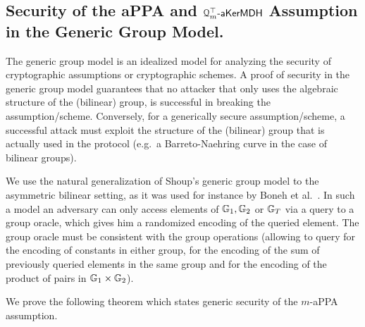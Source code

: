 \subsection{Security of the aPPA and $\mathcal{Q}_m^\top\mbox{-}\mathsf{aKerMDH}$ Assumption in the Generic Group Model.}
The generic group model is an idealized model for analyzing the security of cryptographic assumptions or cryptographic schemes. A proof of security in the generic group model guarantees that no attacker that only uses the algebraic structure of the (bilinear) group, is successful in breaking the assumption/scheme. Conversely, for a generically secure assumption/scheme, a successful attack must exploit the structure of the (bilinear) group that is actually used in the protocol (e.g.~a Barreto-Naehring curve in the case of bilinear groups).  

We use the natural generalization of Shoup's generic group model \cite{EC:Shoup97} to the asymmetric bilinear setting, as it was used for instance by Boneh et al.~\cite{EC:BonBoyGoh05}. In such a model an adversary can only access elements of $\mathbb{G}_1,\mathbb{G}_2$ or $\mathbb{G}_T$ via a query to a group oracle, which gives him a randomized  encoding of the queried element. The group oracle must be consistent with the group operations (allowing to query for the encoding of constants in either group, for the encoding of the sum of previously queried elements in the same group and for the encoding of the product of pairs in $\mathbb{G}_1\times \mathbb{G}_2$).

We prove the following theorem which states generic security of the $m$-aPPA assumption.

